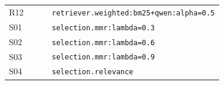 \begin{table}[p]
\begin{tabular}{@{}lp{0.80\linewidth}@{}}
R12 & \texttt{retriever.\allowbreak{}weighted:\allowbreak{}bm25+\allowbreak{}qwen:\allowbreak{}alpha=\allowbreak{}0.\allowbreak{}5} \\
S01 & \texttt{selection.\allowbreak{}mmr:\allowbreak{}lambda=\allowbreak{}0.\allowbreak{}3} \\
S02 & \texttt{selection.\allowbreak{}mmr:\allowbreak{}lambda=\allowbreak{}0.\allowbreak{}6} \\
S03 & \texttt{selection.\allowbreak{}mmr:\allowbreak{}lambda=\allowbreak{}0.\allowbreak{}9} \\
S04 & \texttt{selection.\allowbreak{}relevance} \\
\bottomrule
\end{tabular}
\end{table}
